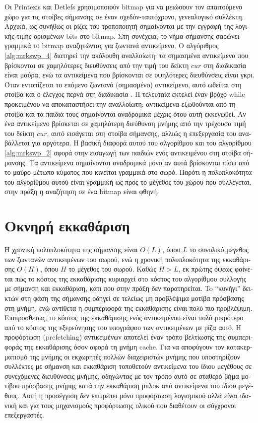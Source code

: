 \begin{greek}
Οι Printezis και Detlefs \cite{DBLP:conf/iwmm/PrintezisD00}
χρησιμοποιούν bitmap για να μειώσουν τον απαιτούμενο χώρο
για τις στοίβες σήμανσης σε έναν σχεδόν-ταυτόχρονο, γενεαλογικό
συλλέκτη. Αρχικά, ως συνήθως οι ρίζες του τροποποιητή σημαίνονται
με την εγγραφή της λογικής τιμής ορισμένων bits στο bitmap.
Στη συνέχεια, το νήμα σήμανσης σαρώνει γραμμικά το bitmap αναζητώντας
για ζωντανά αντικείμενα. Ο αλγόριθμος \ref{alg:mrkswp_4}
διατηρεί την ακόλουθη αναλλοίωτη: τα σημασμένα αντικείμενα
που βρίσκονται σε χαμηλότερες διευθύνσεις από την τιμή του
δείκτη $cur$ στη διαδικασία \textenglish{} είναι μαύρα,
ενώ τα αντικείμενα που βρίσκονται σε υψηλότερες διευθύνσεις
είναι γκρι. Όταν εντοπίζεται το επόμενο ζωντανό (σημασμένο)
αντικείμενο, αυτό ωθείται στη στοίβα και ο έλεγχος περνά
στη διαδικασία \textenglish{}. Η τελευταία εκτελεί έναν
βρόχο while προκειμένου να αποκαταστήσει την αναλλοίωτη:
αντικείμενα εξωθούνται από τη στοίβα και τα παιδιά τους
σημαίνονται αναδρομικά μέχρις ότου αυτή εκκενωθεί. Αν ένα
αντικείμενο βρίσκεται σε χαμηλότερη διεύθυνση μνήμης από
την τρέχουσα τιμή του δείκτη $cur$, αυτό εισάγεται στη στοίβα
σήμανσης, αλλιώς η επεξεργασία του αναβάλλεται για αργότερα. 
Η βασική διαφορά αυτού του αλγορίθμου και του αλγορίθμου 
\ref{alg:mrkswp_2} αφορά στην εισαγωγή των παιδιών ενός 
αντικειμένου στη στοίβα σήμανσης. Τα αντικείμενα σημαίνονται 
αναδρομικά μόνο αν αυτά βρίσκονται πίσω από το μαύρο μέτωπο κύματος 
που κινείται γραμμικά στο σωρό. Παρότι η πολυπλοκότητα του αλγορίθμου 
αυτού είναι γραμμική ως προς το μέγεθος του χώρου που συλλέγεται, 
στην πράξη η αναζήτηση σε ένα bitmap είναι φθηνή.
 
\section{Οκνηρή εκκαθάριση}
Η χρονική πολυπλοκότητα της σήμανσης είναι $O(L)$, όπου $L$ το 
συνολικό μέγεθος των ζωντανών αντικειμένων του σωρού, ενώ η 
χρονική πολυπλοκότητα της εκκαθάρισης $O(H)$, όπου $H$ το μέγεθος 
του σωρού. Καθώς $H>L$, εκ πρώτης όψεως φαίνεται πώς το κόστος 
της εκκαθάρισης κυριαρχεί στο κόστος του αλγορίθμου συλλογής με 
σήμανση και εκκαθάριση, κάτι που στην πράξη δεν παρατηρείται. To 
``κυνήγι'' δεικτών στη φάση της σήμανσης οδηγεί σε τελείως μη 
προβλέψιμα μοτίβα πρόσβασης στη μνήμη, ενώ αντίθετα η συμπεριφορά 
της εκκαθάρισης είναι πολύ πιο προβλέψιμη. Επιπροσθέτως, το 
κόστος της εκκαθάρισης ενός αντικειμένου είναι πολύ μικρότερο από 
το κόστος της εξερεύνησης του υπογράφου των αντικειμένων με ρίζα 
αυτό. Η προφόρτωση (prefetching) αντικειμένων αποτελεί έναν τρόπο 
βελτίωσης της συμπεριφοράς της εκκαθάρισης όσον αφορά τη μνήμη 
cache. Για να αποφύγουν τον κατακερματισμό της μνήμης οι εκχωρητές 
πολλών διαχειριστών μνήμης που υποστηρίζουν συλλέκτες με σήμανση 
και εκκαθάριση τοποθετούν αντικείμενα του ίδιου μεγέθους σε 
συνεχόμενες διευθύνσεις μνήμης, οδηγώντας με τον τρόπο αυτό σε
σταθερό βήμα μοτίβου πρόσβασης μνήμης κατά την εκκαθάριση μπλοκ
από αντικείμενα του ίδιου μεγέθους. Αυτή η προσέγγιση δεν 
επιτρέπει μόνο προφόρτωση λογισμικού αλλά είναι ιδανική και για
τους μηχανισμούς προφόρτωσης υλικού που διαθέτουν οι σύγχρονοι
επεξεργαστές.


\end{greek}
